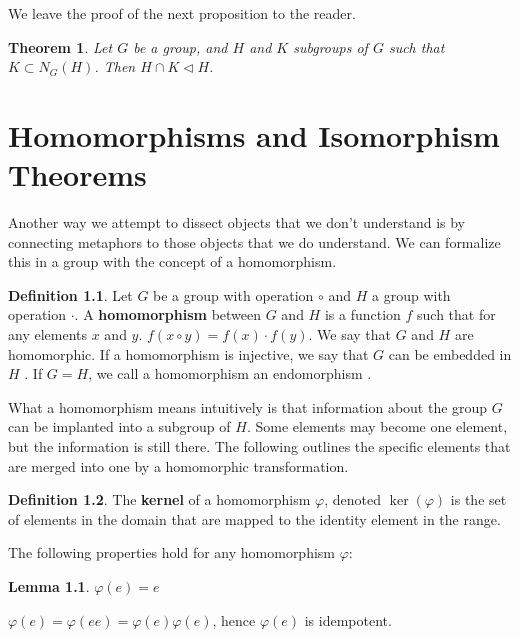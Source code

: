 \documentclass[12pt]{amsbook}
\makeatletter
\theoremstyle{plain}
\newtheorem{theorem}{Theorem}[chapter]
\newtheorem{lemma}[theorem]{Lemma}
\theoremstyle{definition}
\newtheorem{definition}{Definition}
\renewenvironment{proof}[1][\proofname]{\par
  \pushQED{\qed}%
  \normalfont \topsep6\p@\@plus6\p@\relax
  \list{}{\leftmargin=0em
          \rightmargin=\leftmargin
          \settowidth{\itemindent}{\itshape#1}%
          \labelwidth=\itemindent}

  \item[\hskip\labelsep
        \itshape
    #1\@addpunct{.}]\ignorespaces
}{%
  \popQED\endlist\@endpefalse
}
\makeatother
\begin{document}
We leave the proof of the next proposition to the reader.

\begin{theorem}
    Let $G$ be a group, and $H$ and $K$ subgroups of $G$ such that $K \subset N_G(H)$. Then $H \cap K \lhd H$.
\end{theorem}







\chapter{Homomorphisms and Isomorphism Theorems}

Another way we attempt to dissect objects that we don't understand is by connecting metaphors to those objects that we do understand. We can formalize this in a group with the concept of a homomorphism.

\begin{definition}
Let $G$ be a group with operation $\circ$ and $H$ a group with operation $ \cdotp $. A {\bf homomorphism}  between $G$ and $H$ is a function $f$ such that for any elements $x$ and $y$. $f(x \circ y) = f(x) \cdotp f(y)$. We say that $G$ and $H$ are homomorphic. If a homomorphism is injective, we say that $G$ can be embedded in $H$ . If $G = H$, we call a homomorphism an endomorphism .
\end{definition}

What a homomorphism means intuitively is that information about the group $G$ can be implanted into a subgroup of $H$. Some elements may become one element, but the information is still there. The following outlines the specific elements that are merged into one by a homomorphic transformation.

\begin{definition}
    The {\bf kernel}  of a homomorphism $\varphi$, denoted $\ker(\varphi)$ is the set of elements in the domain that are mapped to the identity element in the range.
\end{definition}

The following properties hold for any homomorphism $\varphi$:

\begin{lemma} $\varphi(e) = e$ \end{lemma}
\begin{proof} $\varphi(e) = \varphi(ee) = \varphi(e)\varphi(e)$, hence $\varphi(e)$ is idempotent. \end{proof}
\end{document}
